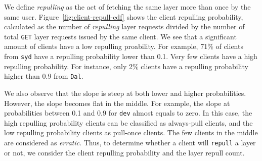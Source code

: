 We define \emph{repulling} as the act of fetching the same layer more than once
by the same user.
Figure~\ref{fig:client-repull-cdf} shows the client repulling probability,
calculated as the number of \emph{repulling} layer requests divided by the
number of total \texttt{GET} layer requests issued by the same client.
%
We see that a significant amount of clients have a low repulling proability.
%
For example, 71\% of clients from \texttt{syd} have a repulling probability lower
than 0.1.
%
Very few clients have a high repulling probability.  For instance,
only 2\% clients have a repulling probability higher than 0.9 from
\texttt{Dal}.


We also observe that the slope is steep at both lower and higher probabilities.
However, the slope becomes flat in the middle.
%
For example, the slope at probabilities between 0.1 and 0.9 for \texttt{dev}
almost equals to zero.
%
In this case, the high repulling probability clients can be classified as
always-pull clients, and the low repulling probability clients as pull-once
clients.
%
The few clients in the middle are considered as \emph{erratic}.
%
Thus, to determine whether a client will \texttt{repull} a layer or not, we
consider the client repulling probability and the layer repull count.



